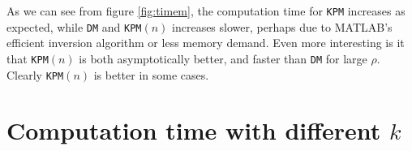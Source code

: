As we can see from figure \ref{fig:timem}, the computation time for \texttt{KPM} increases as expected, while \texttt{DM} and \texttt{KPM}$(n)$ increases slower, perhaps due to MATLAB's efficient inversion algorithm or less memory demand. 
Even more interesting is it that \texttt{KPM}$(n)$ is both asymptotically better, and faster than \texttt{DM} for large $\rho$. Clearly \texttt{KPM}$(n)$ is better in some cases.
\section{Computation time with different $k$} \label{sec:stimek}
